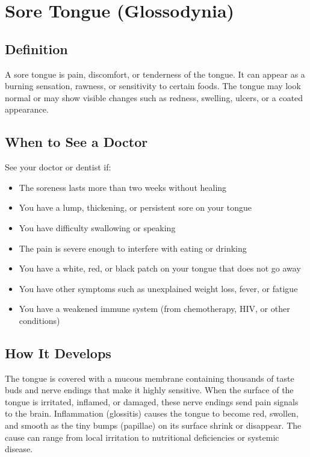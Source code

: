 \chapter{Sore Tongue (Glossodynia)}

\section*{Definition}
A sore tongue is pain, discomfort, or tenderness of the tongue. It can appear as a burning sensation, rawness, or sensitivity to certain foods. The tongue may look normal or may show visible changes such as redness, swelling, ulcers, or a coated appearance.

\section*{When to See a Doctor}
See your doctor or dentist if:
\begin{itemize}
  \item The soreness lasts more than two weeks without healing
  \item You have a lump, thickening, or persistent sore on your tongue
  \item You have difficulty swallowing or speaking
  \item The pain is severe enough to interfere with eating or drinking
  \item You have a white, red, or black patch on your tongue that does not go away
  \item You have other symptoms such as unexplained weight loss, fever, or fatigue
  \item You have a weakened immune system (from chemotherapy, HIV, or other conditions)
\end{itemize}

\section*{How It Develops}
The tongue is covered with a mucous membrane containing thousands of taste buds and nerve endings that make it highly sensitive. When the surface of the tongue is irritated, inflamed, or damaged, these nerve endings send pain signals to the brain. Inflammation (glossitis) causes the tongue to become red, swollen, and smooth as the tiny bumps (papillae) on its surface shrink or disappear. The cause can range from local irritation to nutritional deficiencies or systemic disease.

